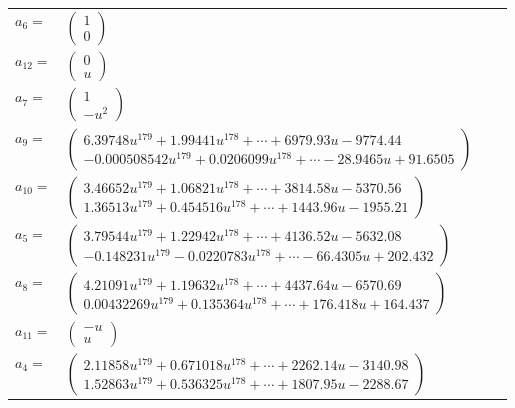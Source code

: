 \documentclass[1p]{elsarticle_modified}
\theoremstyle{definition}
\begin{document}
\begin{tabular}{m{7pt} m{180pt} m{7pt} m{180pt} }
\flushright $a_{6}=$&$\begin{pmatrix}1\\0\end{pmatrix}$ \\
\flushright $a_{12}=$&$\begin{pmatrix}0\\u\end{pmatrix}$ \\
\flushright $a_{7}=$&$\begin{pmatrix}1\\- u^2\end{pmatrix}$ \\
\flushright $a_{9}=$&$\begin{pmatrix}6.39748 u^{179}+1.99441 u^{178}+\cdots+6979.93 u-9774.44\\-0.000508542 u^{179}+0.0206099 u^{178}+\cdots-28.9465 u+91.6505\end{pmatrix}$ \\
\flushright $a_{10}=$&$\begin{pmatrix}3.46652 u^{179}+1.06821 u^{178}+\cdots+3814.58 u-5370.56\\1.36513 u^{179}+0.454516 u^{178}+\cdots+1443.96 u-1955.21\end{pmatrix}$ \\
\flushright $a_{5}=$&$\begin{pmatrix}3.79544 u^{179}+1.22942 u^{178}+\cdots+4136.52 u-5632.08\\-0.148231 u^{179}-0.0220783 u^{178}+\cdots-66.4305 u+202.432\end{pmatrix}$ \\
\flushright $a_{8}=$&$\begin{pmatrix}4.21091 u^{179}+1.19632 u^{178}+\cdots+4437.64 u-6570.69\\0.00432269 u^{179}+0.135364 u^{178}+\cdots+176.418 u+164.437\end{pmatrix}$ \\
\flushright $a_{11}=$&$\begin{pmatrix}- u\\u\end{pmatrix}$ \\
\flushright $a_{4}=$&$\begin{pmatrix}2.11858 u^{179}+0.671018 u^{178}+\cdots+2262.14 u-3140.98\\1.52863 u^{179}+0.536325 u^{178}+\cdots+1807.95 u-2288.67\end{pmatrix}$ \\

\end{tabular}
\end{document}
